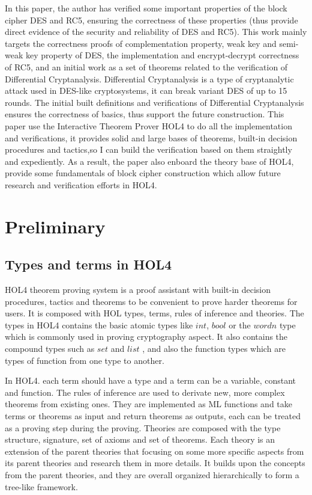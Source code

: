 \documentclass{article}
\begin{document}
In this paper, the author has verified some important properties
of the block cipher DES and RC5, ensuring the correctness of these
properties (thus provide
direct evidence of the security and reliability of DES and RC5).
This work mainly targets the correctness proofs of complementation property,
weak key and semi-weak key property of DES, the implementation and
encrypt-decrypt correctness of RC5, and an initial work as a set of
theorems related to the verification
of Differential Cryptanalysis. Differential Cryptanalysis is a type of cryptanalytic attack used in DES-like
cryptosystems, it can break variant DES of up to 15 rounds. The initial built definitions and verifications of
Differential Cryptanalysis ensures the correctness of basics, thus support the future construction. This paper
use the Interactive Theorem Prover HOL4 to do all the implementation and verifications, it provides solid and
large bases of theorems, built-in decision procedures and tactics,so I can build the verification based on them
straightly and expediently. As a result, the paper also enboard the theory base of HOL4, provide some
fundamentals of block cipher construction which allow future research and verification efforts in HOL4.

\section{Preliminary}

\subsection{Types and terms in HOL4}
HOL4 theorem proving system is a proof assistant with built-in decision procedures, tactics and theorems to
be convenient to prove harder theorems for users. It is composed with HOL types, terms, rules of inference
and theories. The types in HOL4 contains the basic atomic types like $int$, $bool$ or the $word n$ type which
is commonly used in proving cryptography aspect. It also contains the compound types such as $set$ and $list$
, and also the function types which are types of function from one type to another.

In HOL4. each term should
have a type and a term can be a variable, constant and function. The rules of inference are used to derivate
new, more complex theorems from existing ones. They are implemented as ML functions and take terms or theorems
as input and return theorems as outputs, each can be treated as a proving step during the proving. Theories are
composed with the type structure, signature, set of axioms and set of theorems. Each theory is an extension of
the parent theories that focusing on some more specific aspects from its parent theories and research them in
more details. It builds upon the concepts from the parent theories, and they are overall organized hierarchically
to form a tree-like framework.
\end{document}
